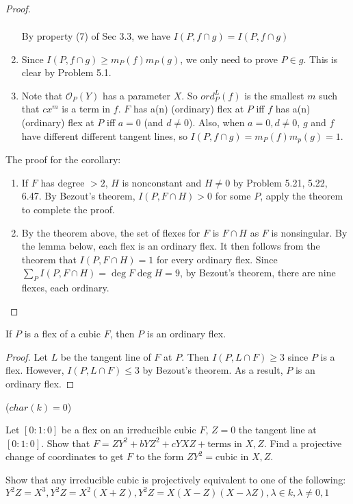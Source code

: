 \documentclass{solution}
\begin{document}
\begin{proof}
\begin{enumerate}
$$\begin{aligned}
            \end{aligned}
        $$
        By property (7) of Sec 3.3, we have $I(P, f \cap g) = I(P, f \cap g)$
        \item Since $I(P, f \cap g) \ge m_P(f) m_P(g)$, we only need to prove $P \in g$. This is clear by Problem 5.1.
        \item Note that $\mathcal{O}_{P}(Y)$ has a parameter $X$. So $ord_P^L(f)$ is the smallest $m$ such that $cx^m$ is a term in $f$. $F$ has a(n) (ordinary) flex at $P$ iff $f$ has a(n) (ordinary) flex at $P$ iff $a = 0$ (and $d \ne 0$). Also, when $a = 0, d \ne 0$, $g$ and $f$ have different different tangent lines, so $I(P, f \cap g) = m_P(f)m_p(g) = 1$.
    \end{enumerate}

    The proof for the corollary:
    \begin{enumerate}
        \item If $F$ has degree $\gt 2$, $H$ is nonconstant and $H \ne 0$ by Problem 5.21, 5.22, 6.47. By Bezout's theorem, $I(P, F \cap H) \gt 0$ for some $P$, apply the theorem to complete the proof.
        \item By the theorem above, the set of flexes for $F$ is $F \cap H$ as $F$ is nonsingular. By the lemma below, each flex is an ordinary flex. It then follows from the theorem that $I(P, F \cap H) = 1$ for every ordinary flex. Since $\sum\limits_{P} I(P, F \cap H) = \deg F \deg H = 9$, by Bezout's theorem, there are nine flexes, each ordinary. 
    \end{enumerate}
\end{proof}

\begin{lemma}
    If $P$ is a flex of a cubic $F$, then $P$ is an ordinary flex.
\end{lemma}

\begin{proof}
    Let $L$ be the tangent line of $F$ at $P$. Then $I(P, L \cap F) \ge 3$ since $P$ is a flex. However, $I(P, L \cap F) \le 3$ by Bezout's theorem. As a result, $P$ is an ordinary flex.
\end{proof}

\begin{problem}{5.24}
    ($char(k) = 0$) \begin{inparaenum}
        \item Let $[0:1:0]$ be a flex on an irreducible cubic $F$, $Z = 0$ the tangent line at $[0:1:0]$. Show that $F = ZY^2 + bYZ^2 + cYXZ + \text{terms in $X, Z$}$. Find a projective change of coordinates to get $F$ to the form $ZY^2 = \text{cubic in $X, Z$}$.
        \item Show that any irreducible cubic is projectively equivalent to one of the following: $Y^2Z = X^3, Y^2Z = X^2(X + Z), Y^2Z = X(X - Z)(X - \lambda Z), \lambda \in k, \lambda \ne 0, 1$
    \end{inparaenum}
\end{problem}
\end{document}
